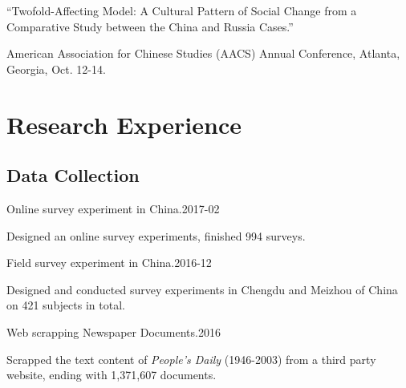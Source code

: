 \documentclass[10.5pt,]{article}
\providecommand{\tightlist}{%
	\setlength{\itemsep}{0pt}\setlength{\parskip}{0pt}}
\renewenvironment{itemize}{
	\begin{list}{}{
			\setlength{\leftmargin}{1.5em}
		}
	}{
	\end{list}
}
\begin{document}
\begin{itemize}
  \begin{itemize}
  \tightlist
  \item
    ``Twofold-Affecting Model: A Cultural Pattern of Social Change from
    a Comparative Study between the China and Russia Cases.''

    \begin{itemize}
    \tightlist
    \item
      \footnotesize American Association for Chinese Studies (AACS)
      Annual Conference, Atlanta, Georgia, Oct. 12-14.
    \end{itemize}
  \end{itemize}
\end{itemize}

\section{Research Experience}\label{research-experience}

\subsection{Data Collection}\label{data-collection}

\begin{itemize}
\tightlist
\item
  Online survey experiment in China.\hfill 2017-02

  \begin{itemize}
  \tightlist
  \item
    \footnotesize Designed an online survey experiments, finished 994
    surveys.
  \end{itemize}
\item
  Field survey experiment in China.\hfill 2016-12

  \begin{itemize}
  \tightlist
  \item
    \footnotesize Designed and conducted survey experiments in Chengdu
    and Meizhou of China on 421 subjects in total.
  \end{itemize}
\item
  Web scrapping Newspaper Documents.\hfill 2016

  \begin{itemize}
  \tightlist
  \item
    \footnotesize Scrapped the text content of \emph{People's Daily}
    (1946-2003) from a third party website, ending with 1,371,607
    documents.
  \end{itemize}
\end{itemize}
\end{document}
